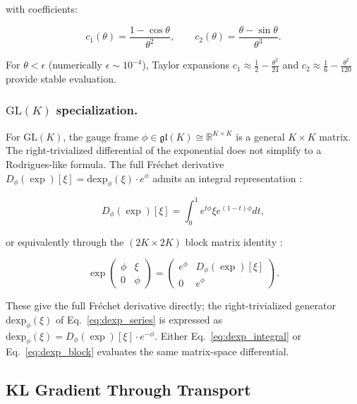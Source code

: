 \documentclass[twoside,11pt]{article}
\begin{document}
with coefficients:

\begin{equation}
c_1(\theta) = \frac{1 - \cos\theta}{\theta^2}, \qquad c_2(\theta) = \frac{\theta - \sin\theta}{\theta^3}.
\end{equation}

For $\theta < \epsilon$ (numerically $\epsilon \sim 10^{-4}$), Taylor expansions $c_1 \approx \frac{1}{2} - \frac{\theta^2}{24}$ and $c_2 \approx \frac{1}{6} - \frac{\theta^2}{120}$ provide stable evaluation.

\subsubsection{$\mathrm{GL}(K)$ specialization.}

For $\mathrm{GL}(K)$, the gauge frame $\phi \in \mathfrak{gl}(K) \cong \mathbb{R}^{K \times K}$ is a general $K \times K$ matrix. The right-trivialized differential of the exponential does not simplify to a Rodrigues-like formula. The full Fr\'{e}chet derivative $D_\phi(\exp)[\xi] = \mathrm{dexp}_\phi(\xi) \cdot e^\phi$ admits an integral representation \citep[Eq.~10.15]{Higham2008}:

\begin{equation}
D_\phi(\exp)[\xi] = \int_0^1 e^{t\phi} \xi e^{(1-t)\phi} dt,
\label{eq:dexp_integral}
\end{equation}

or equivalently through the $(2K \times 2K)$ block matrix identity \citep[Algorithm~10.27]{Higham2008}:

\begin{equation}
\exp \begin{pmatrix} \phi & \xi \\ 0 & \phi \end{pmatrix}
= \begin{pmatrix} e^\phi & D_\phi(\exp)[\xi] \\ 0 & e^\phi \end{pmatrix}.
\label{eq:dexp_block}
\end{equation}

These give the full Fr\'{e}chet derivative directly; the right-trivialized generator $\mathrm{dexp}_\phi(\xi)$ of Eq.~\eqref{eq:dexp_series} is expressed as $\mathrm{dexp}_\phi(\xi) = D_\phi(\exp)[\xi] \cdot e^{-\phi}$. Either Eq.~\eqref{eq:dexp_integral} or Eq.~\eqref{eq:dexp_block} evaluates the same matrix-space differential.

\subsection{KL Gradient Through Transport}
\end{document}
